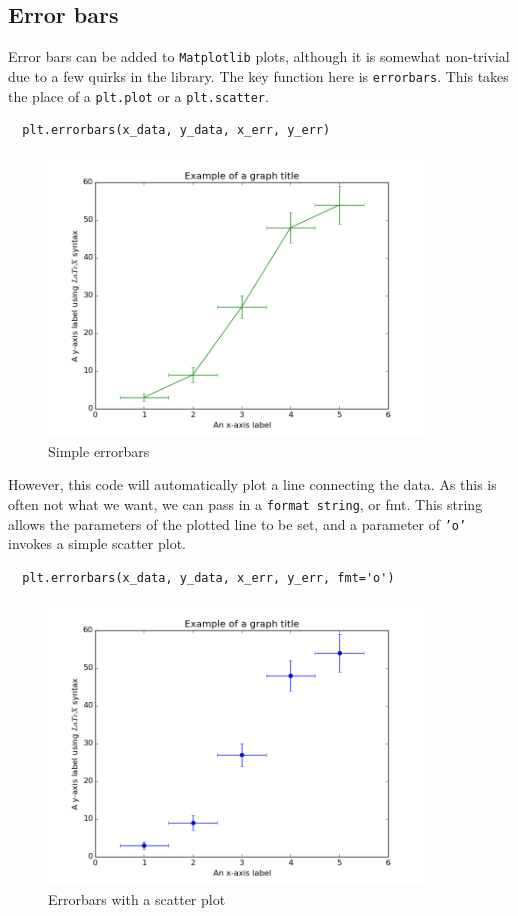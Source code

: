 \documentclass{article}
\begin{document}
\subsection{Error bars}
Error bars can be added to \texttt{Matplotlib} plots, although it is
somewhat non-trivial due to a few quirks in the library. The key
function here is \texttt{errorbars}. This takes the place of a
\texttt{plt.plot} or a \texttt{plt.scatter}.

\begin{lstlisting}
  plt.errorbars(x_data, y_data, x_err, y_err)
\end{lstlisting}

\begin{figure}[H]
  \centering
  \includegraphics[width=10cm]{ch3}
  \caption{Simple errorbars}
  \label{fig:ch3_1}
\end{figure}

However, this code will automatically plot a line connecting the
data. As this is often not what we want, we can pass in a
\texttt{format string}, or fmt. This string allows the parameters of
the plotted line to be set, and a parameter of \texttt{'o'}
invokes a simple scatter plot.

\begin{lstlisting}
  plt.errorbars(x_data, y_data, x_err, y_err, fmt='o')
\end{lstlisting}

\begin{figure}[H]
  \centering
  \includegraphics[width=10cm]{ch3_2}
  \caption{Errorbars with a scatter plot}
  \label{fig:ch3_2}
\end{figure}
\end{document}
